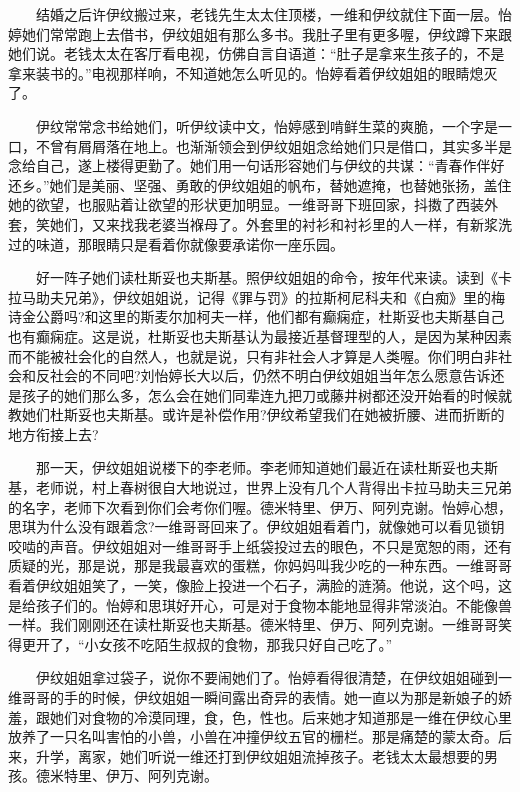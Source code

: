 \documentclass[12pt,UTF8]{ctexbook}
\begin{document}
　　结婚之后许伊纹搬过来，老钱先生太太住顶楼，一维和伊纹就住下面一层。怡婷她们常常跑上去借书，伊纹姐姐有那么多书。我肚子里有更多喔，伊纹蹲下来跟她们说。老钱太太在客厅看电视，仿佛自言自语道：\enquote{肚子是拿来生孩子的，不是拿来装书的。}电视那样响，不知道她怎么听见的。怡婷看着伊纹姐姐的眼睛熄灭了。

　　伊纹常常念书给她们，听伊纹读中文，怡婷感到啃鲜生菜的爽脆，一个字是一口，不曾有屑屑落在地上。也渐渐领会到伊纹姐姐念给她们只是借口，其实多半是念给自己，遂上楼得更勤了。她们用一句话形容她们与伊纹的共谋：\enquote{青春作伴好还乡。}她们是美丽、坚强、勇敢的伊纹姐姐的帆布，替她遮掩，也替她张扬，盖住她的欲望，也服贴着让欲望的形状更加明显。一维哥哥下班回家，抖擞了西装外套，笑她们，又来找我老婆当褓母了。外套里的衬衫和衬衫里的人一样，有新浆洗过的味道，那眼睛只是看着你就像要承诺你一座乐园。

　　好一阵子她们读杜斯妥也夫斯基。照伊纹姐姐的命令，按年代来读。读到《卡拉马助夫兄弟》，伊纹姐姐说，记得《罪与罚》的拉斯柯尼科夫和《白痴》里的梅诗金公爵吗?和这里的斯麦尔加柯夫一样，他们都有癫痫症，杜斯妥也夫斯基自己也有癫痫症。这是说，杜斯妥也夫斯基认为最接近基督理型的人，是因为某种因素而不能被社会化的自然人，也就是说，只有非社会人才算是人类喔。你们明白非社会和反社会的不同吧?刘怡婷长大以后，仍然不明白伊纹姐姐当年怎么愿意告诉还是孩子的她们那么多，怎么会在她们同辈连九把刀或藤井树都还没开始看的时候就教她们杜斯妥也夫斯基。或许是补偿作用?伊纹希望我们在她被折腰、进而折断的地方衔接上去?

　　那一天，伊纹姐姐说楼下的李老师。李老师知道她们最近在读杜斯妥也夫斯基，老师说，村上春树很自大地说过，世界上没有几个人背得出卡拉马助夫三兄弟的名字，老师下次看到你们会考你们喔。德米特里、伊万、阿列克谢。怡婷心想，思琪为什么没有跟着念?一维哥哥回来了。伊纹姐姐看着门，就像她可以看见锁钥咬啮的声音。伊纹姐姐对一维哥哥手上纸袋投过去的眼色，不只是宽恕的雨，还有质疑的光，那是说，那是我最喜欢的蛋糕，你妈妈叫我少吃的一种东西。一维哥哥看着伊纹姐姐笑了，一笑，像脸上投进一个石子，满脸的涟漪。他说，这个吗，这是给孩子们的。怡婷和思琪好开心，可是对于食物本能地显得非常淡泊。不能像兽一样。我们刚刚还在读杜斯妥也夫斯基。德米特里、伊万、阿列克谢。一维哥哥笑得更开了，\enquote{小女孩不吃陌生叔叔的食物，那我只好自己吃了。}

　　伊纹姐姐拿过袋子，说你不要闹她们了。怡婷看得很清楚，在伊纹姐姐碰到一维哥哥的手的时候，伊纹姐姐一瞬间露出奇异的表情。她一直以为那是新娘子的娇羞，跟她们对食物的冷漠同理，食，色，性也。后来她才知道那是一维在伊纹心里放养了一只名叫害怕的小兽，小兽在冲撞伊纹五官的栅栏。那是痛楚的蒙太奇。后来，升学，离家，她们听说一维还打到伊纹姐姐流掉孩子。老钱太太最想要的男孩。德米特里、伊万、阿列克谢。
\end{document}
